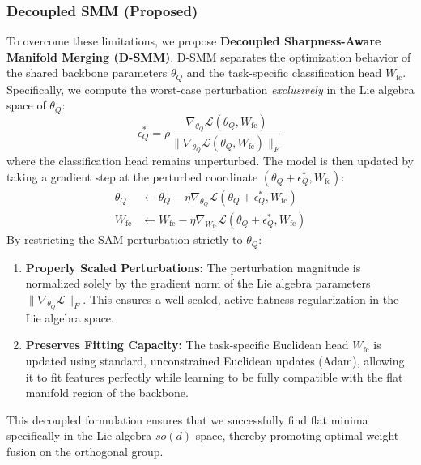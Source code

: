 \documentclass{article}
\theoremstyle{plain}
\theoremstyle{definition}
\theoremstyle{remark}
\begin{document}
\subsubsection{Decoupled SMM (Proposed)}
To overcome these limitations, we propose \textbf{Decoupled Sharpness-Aware Manifold Merging (D-SMM)}. D-SMM separates the optimization behavior of the shared backbone parameters $\theta_Q$ and the task-specific classification head $W_{\text{fc}}$. Specifically, we compute the worst-case perturbation \textit{exclusively} in the Lie algebra space of $\theta_Q$:
\begin{equation}
    \epsilon^*_Q = \rho \frac{\nabla_{\theta_Q} \mathcal{L}(\theta_Q, W_{\text{fc}})}{\|\nabla_{\theta_Q} \mathcal{L}(\theta_Q, W_{\text{fc}})\|_F}
\end{equation}
where the classification head remains unperturbed. The model is then updated by taking a gradient step at the perturbed coordinate $(\theta_Q + \epsilon^*_Q, W_{\text{fc}})$:
\begin{align}
    \theta_Q &\leftarrow \theta_Q - \eta \nabla_{\theta_Q} \mathcal{L}(\theta_Q + \epsilon^*_Q, W_{\text{fc}}) \\
    W_{\text{fc}} &\leftarrow W_{\text{fc}} - \eta \nabla_{W_{\text{fc}}} \mathcal{L}(\theta_Q + \epsilon^*_Q, W_{\text{fc}})
\end{align}
By restricting the SAM perturbation strictly to $\theta_Q$:
\begin{enumerate}
    \item \textbf{Properly Scaled Perturbations:} The perturbation magnitude is normalized solely by the gradient norm of the Lie algebra parameters $\|\nabla_{\theta_Q} \mathcal{L}\|_F$. This ensures a well-scaled, active flatness regularization in the Lie algebra space.
    \item \textbf{Preserves Fitting Capacity:} The task-specific Euclidean head $W_{\text{fc}}$ is updated using standard, unconstrained Euclidean updates (Adam), allowing it to fit features perfectly while learning to be fully compatible with the flat manifold region of the backbone.
\end{enumerate}

This decoupled formulation ensures that we successfully find flat minima specifically in the Lie algebra $so(d)$ space, thereby promoting optimal weight fusion on the orthogonal group.
\end{document}
